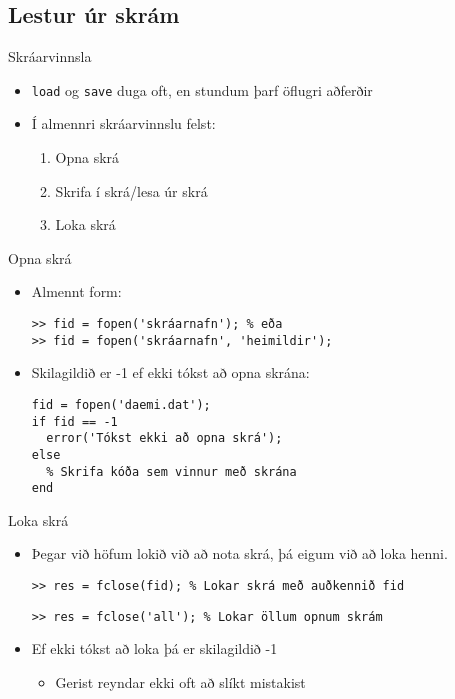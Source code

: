 \documentclass{beamer}
\begin{document}
\subsection{Lestur úr skrám}

\begin{frame}{Skráarvinnsla}
\begin{itemize}
 \item \texttt{load} og \texttt{save} duga oft, en stundum þarf öflugri aðferðir
 \item Í almennri skráarvinnslu felst:
 \begin{enumerate}
  \item Opna skrá
  \item Skrifa í skrá/lesa úr skrá
  \item Loka skrá
 \end{enumerate}
\end{itemize}
\end{frame}

\begin{frame}[fragile]{Opna skrá}
\begin{itemize}
 \item Almennt form:
\begin{verbatim}
>> fid = fopen('skráarnafn'); % eða
>> fid = fopen('skráarnafn', 'heimildir');
\end{verbatim}
 \item Skilagildið er -1 ef ekki tókst að opna skrána:
\begin{verbatim}
fid = fopen('daemi.dat');
if fid == -1
  error('Tókst ekki að opna skrá');
else
  % Skrifa kóða sem vinnur með skrána
end
\end{verbatim}
\end{itemize}
\end{frame}

\begin{frame}[fragile]{Loka skrá}
\begin{itemize}
 \item Þegar við höfum lokið við að nota skrá, þá eigum við að loka henni.
\begin{verbatim}
>> res = fclose(fid); % Lokar skrá með auðkennið fid
\end{verbatim}
\begin{verbatim}
>> res = fclose('all'); % Lokar öllum opnum skrám
\end{verbatim}
 \item Ef ekki tókst að loka þá er skilagildið -1
 \begin{itemize}
  \item Gerist reyndar ekki oft að slíkt mistakist
 \end{itemize}
\end{itemize}
\end{frame}
\end{document}
